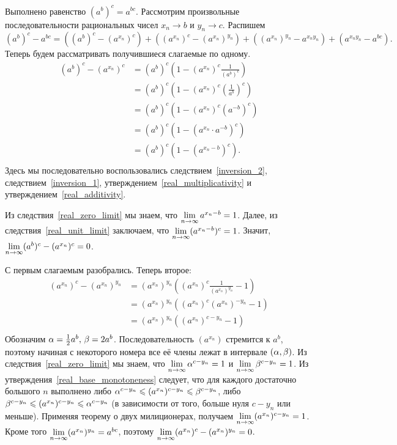 \documentclass[a4paper,12pt,fleqn]{article}
\begin{document}
\label{real_composition}
Выполнено равенство $(a^b)^c = a^{bc}$.
Рассмотрим произвольные последовательности рациональных чисел $x_n \to b$ и $y_n \to c$. Распишем 
\[(a^b)^c - a^{bc} = ((a^b)^c - (a^{x_n})^c) + ((a^{x_n})^c - (a^{x_n})^{y_n}) + ((a^{x_n})^{y_n} - a^{x_n y_n}) + (a^{x_n y_n} - a^{bc}).\] 
Теперь будем рассматривать получившиеся слагаемые по одному.
\[
\begin{aligned}
(a^b)^c - (a^{x_n})^c
&= (a^b)^c \left(1 - (a^{x_n})^c \frac{1}{(a^b)^c}\right) \\
&= (a^b)^c \left(1 - (a^{x_n})^c \left(\frac{1}{a^b}\right)^c\right) \\
&= (a^b)^c \left(1 - (a^{x_n})^c (a^{-b})^c\right) \\
&= (a^b)^c \left(1 - (a^{x_n} \cdot a^{-b})^c\right) \\
&= (a^b)^c \left(1 - (a^{x_n - b})^c\right). \\
\end{aligned}
\]
Здесь мы последовательно воспользовались следствием~\ref{inversion_2}, следствием~\ref{inversion_1}, утверждением~\ref{real_multiplicativity} и утверждением~\ref{real_additivity}.

Из следствия~\ref{real_zero_limit} мы знаем, что $\lim\limits_{n \rightarrow \infty} a^{x_n - b} = 1$. Далее, из следствия~\ref{real_unit_limit} заключаем, что $\lim\limits_{n \rightarrow \infty} (a^{x_n - b})^c = 1$. Значит, $\lim\limits_{n \rightarrow \infty} (a^b)^c - (a^{x_n})^c = 0$.

С первым слагаемым разобрались. Теперь второе:
\[
\begin{aligned}
(a^{x_n})^c - (a^{x_n})^{y_n}
&= (a^{x_n})^{y_n} \left((a^{x_n})^c \frac{1}{(a^{x_n})^{y_n}} - 1\right) \\
&= (a^{x_n})^{y_n} \left((a^{x_n})^{c} (a^{x_n})^{-y_n} - 1\right) \\
&= (a^{x_n})^{y_n} \left((a^{x_n})^{c-y_n} - 1\right) \\
\end{aligned}
\]
Обозначим $\alpha = \frac12 a^b,\, \beta = 2a^b$. Последовательность $(a^{x_n})$ стремится к $a^b$, поэтому начиная с некоторого номера все её члены лежат в интервале $(\alpha, \beta)$. Из следствия~\ref{real_zero_limit} мы знаем, что $\lim\limits_{n \rightarrow \infty} \alpha^{c-y_n} = 1$ и $\lim\limits_{n \rightarrow \infty} \beta^{c-y_n} = 1$. Из утверждения~\ref{real_base_monotoneness} следует, что для каждого достаточно большого $n$ выполнено либо $\alpha^{c-y_n} \leqslant (a^{x_n})^{c-y_n} \leqslant \beta^{c-y_n}$, либо $\beta^{c-y_n} \leqslant (a^{x_n})^{c-y_n} \leqslant \alpha^{c-y_n}$ (в зависимости от того, больше нуля $c-y_n$ или меньше). Применяя теорему о двух милиционерах, получаем $\lim\limits_{n \rightarrow \infty} (a^{x_n})^{c-y_n} = 1$. Кроме того $\lim\limits_{n \rightarrow \infty} (a^{x_n})^{y_n} = a^{bc}$, поэтому $\lim\limits_{n \rightarrow \infty} (a^{x_n})^c - (a^{x_n})^{y_n} = 0$.
\end{document}
